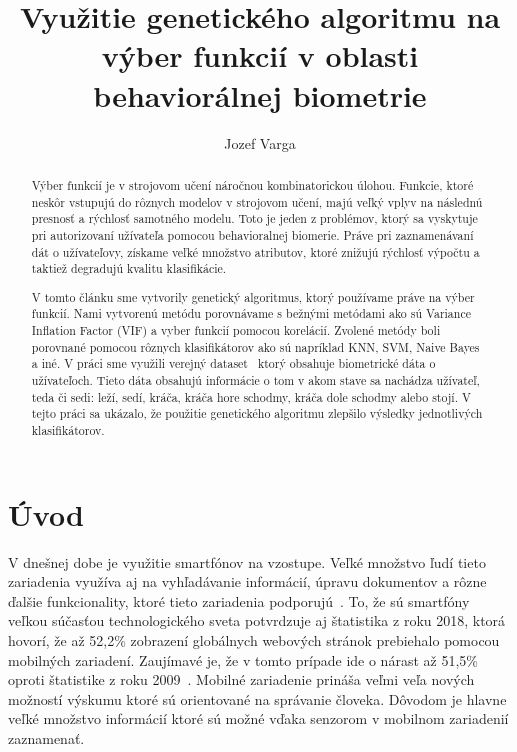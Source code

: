 \documentclass[runningheads]{llncs}
\begin{document}
%
\title{Využitie genetického algoritmu na výber funkcií v oblasti behaviorálnej biometrie}
%
%
\author{Jozef Varga}
%
%
\maketitle              %
%
\begin{abstract}
    Výber funkcií je v strojovom učení náročnou kombinatorickou úlohou. 
    Funkcie, ktoré neskôr vstupujú do rôznych modelov v strojovom učení, majú
    veľký vplyv na následnú presnosť a rýchlosť samotného modelu. Toto je jeden z problémov,
    ktorý sa vyskytuje pri autorizovaní užívateľa pomocou behavioralnej biomerie. Práve pri
    zaznamenávaní dát o užívateľovy, získame veľké množstvo atributov, ktoré znižujú rýchlosť výpočtu
    a taktiež degradujú kvalitu klasifikácie. 
    
    V tomto článku sme vytvorily genetický algoritmus, ktorý používame práve na výber funkcií. Nami vytvorenú
    metódu porovnávame s bežnými metódami ako sú Variance Inflation Factor (VIF) a vyber funkcií pomocou korelácií. 
    Zvolené metódy boli porovnané pomocou rôznych klasifikátorov ako sú napríklad KNN, SVM, Naive Bayes a iné. 
    V práci sme využili verejný dataset~\cite{ref_dataset_anguita,ref_dataset} ktorý obsahuje biometrické dáta o užívateľoch. Tieto dáta obsahujú informácie o tom v akom stave sa nachádza užívateľ, teda či sedi: leží, sedí, kráča,  kráča hore schodmy, kráča dole schodmy alebo stojí.
    V tejto práci sa ukázalo, že použitie genetického algoritmu zlepšilo výsledky jednotlivých klasifikátorov.

\end{abstract}
%

\section{Úvod}

V dnešnej dobe je využitie smartfónov na vzostupe. 
Veľké množstvo ľudí tieto zariadenia využíva aj na vyhľadávanie informácií, 
úpravu dokumentov a rôzne ďalšie funkcionality, 
ktoré tieto zariadenia podporujú~\cite{ref_bomhold}. 
To, že sú smartfóny veľkou súčasťou technologického sveta potvrdzuje aj 
štatistika z roku 2018, ktorá hovorí, že až 52,2\% 
zobrazení globálnych webových stránok prebiehalo pomocou mobilných zariadení. 
Zaujímavé je, že v tomto prípade ide o nárast až 51,5\% 
oproti štatistike z roku 2009~\cite{ref_statista19}. Mobilné zariadenie
prináša veľmi veľa nových možností výskumu ktoré sú orientované na správanie človeka.
Dôvodom je hlavne veľké množstvo informácií ktoré sú možné vďaka senzorom v mobilnom 
zariadenií zaznamenať. 
\end{document}
